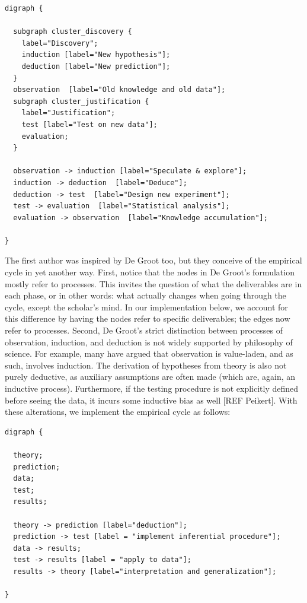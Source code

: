 \documentclass[
  man,floatsintext]{apa6}
\begin{document}
\begin{verbatim}
digraph {

  subgraph cluster_discovery {
    label="Discovery";
    induction [label="New hypothesis"];
    deduction [label="New prediction"];
  }
  observation  [label="Old knowledge and old data"];
  subgraph cluster_justification {
    label="Justification";
    test [label="Test on new data"];
    evaluation;
  }

  observation -> induction [label="Speculate & explore"];
  induction -> deduction  [label="Deduce"];
  deduction -> test  [label="Design new experiment"];
  test -> evaluation  [label="Statistical analysis"];
  evaluation -> observation  [label="Knowledge accumulation"];

}
\end{verbatim}

The first author was inspired by De Groot too,
but they conceive of the empirical cycle in yet another way.
First, notice that the nodes in De Groot's formulation mostly refer to processes.
This invites the question of what the deliverables are in each phase, or in other words: what actually changes when going through the cycle, except the scholar's mind.
In our implementation below, we account for this difference by having the nodes refer to specific deliverables; the edges now refer to processes.
Second, De Groot's strict distinction between processes of observation, induction, and deduction is not widely supported by philosophy of science.
For example, many have argued that observation is value-laden, and as such, involves induction.
The derivation of hypotheses from theory is also not purely deductive,
as auxiliary assumptions are often made (which are, again, an inductive process).
Furthermore, if the testing procedure is not explicitly defined before seeing the data, it incurs some inductive bias as well {[}REF Peikert{]}.
With these alterations, we implement the empirical cycle as follows:

\begin{verbatim}
digraph {

  theory;
  prediction;
  data;
  test;
  results;
  
  theory -> prediction [label="deduction"];
  prediction -> test [label = "implement inferential procedure"];
  data -> results;
  test -> results [label = "apply to data"];
  results -> theory [label="interpretation and generalization"];

}
\end{verbatim}
\end{document}
